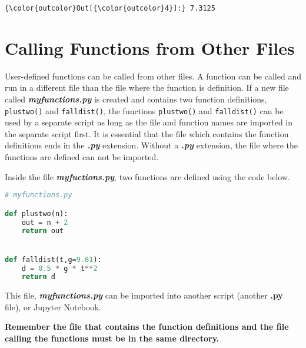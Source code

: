 \documentclass{book}
\newcommand{\passthrough}[1]{#1}
\begin{document}
\begin{Verbatim}[commandchars=\\\{\}]
{\color{outcolor}Out[{\color{outcolor}4}]:} 7.3125
\end{Verbatim}
            

    
        \hypertarget{calling-functions-from-other-files}{%
\section{Calling Functions from Other
Files}\label{calling-functions-from-other-files}}
    




    
        User-defined functions can be called from other files. A function can be
called and run in a different file than the file where the function is
definition. If a new file called \textbf{\emph{myfunctions.py}} is
created and contains two function definitions,
\passthrough{\lstinline!plustwo()!} and
\passthrough{\lstinline!falldist()!}, the functions
\passthrough{\lstinline!plustwo()!} and
\passthrough{\lstinline!falldist()!} can be used by a separate script as
long as the file and function names are imported in the separate script
first. It is essential that the file which contains the function
definitions ends in the \textbf{\emph{.py}} extension. Without a
\textbf{\emph{.py}} extension, the file where the functions are defined
can not be imported.
    




    
        Inside the file \textbf{\emph{myfuctions.py}}, two functions are defined
using the code below.

\begin{lstlisting}[language=Python]
# myfunctions.py

def plustwo(n):
    out = n + 2
    return out


def falldist(t,g=9.81):
    d = 0.5 * g * t**2
    return d
\end{lstlisting}
    




    
        This file, \textbf{\emph{myfunctions.py}} can be imported into another
script (another \textbf{.py} file), or Jupyter Notebook.

\textbf{Remember the file that contains the function definitions and the
file calling the functions must be in the same directory.}
\end{document}
